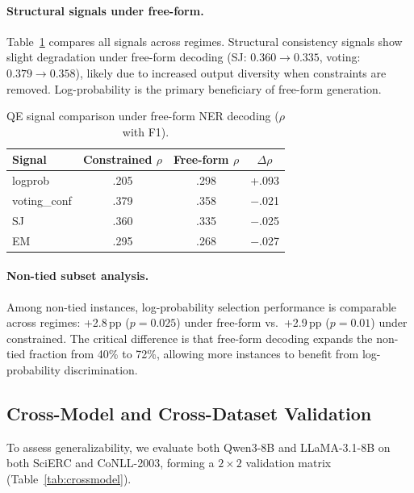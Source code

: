 \documentclass[11pt,a4paper]{article}
\begin{document}
\paragraph{Structural signals under free-form.} Table~\ref{tab:freeform-signals} compares all signals across regimes. Structural consistency signals show slight degradation under free-form decoding (SJ: $0.360 \to 0.335$, voting: $0.379 \to 0.358$), likely due to increased output diversity when constraints are removed. Log-probability is the primary beneficiary of free-form generation.

\begin{table}[t]
\centering
\small
\caption{QE signal comparison under free-form NER decoding ($\rho$ with F1).}
\label{tab:freeform-signals}
\begin{tabular}{lccc}
\toprule
Signal & Constrained $\rho$ & Free-form $\rho$ & $\Delta\rho$ \\
\midrule
logprob & .205 & .298 & +.093 \\
voting\_conf & .379 & .358 & $-$.021 \\
SJ & .360 & .335 & $-$.025 \\
EM & .295 & .268 & $-$.027 \\
\bottomrule
\end{tabular}
\end{table}

\paragraph{Non-tied subset analysis.} Among non-tied instances, log-probability selection performance is comparable across regimes: +2.8\,pp ($p{=}0.025$) under free-form vs.\ +2.9\,pp ($p{=}0.01$) under constrained. The critical difference is that free-form decoding expands the non-tied fraction from 40\% to 72\%, allowing more instances to benefit from log-probability discrimination.

\subsection{Cross-Model and Cross-Dataset Validation}
\label{sec:crossval}

To assess generalizability, we evaluate both Qwen3-8B and LLaMA-3.1-8B on both SciERC and CoNLL-2003, forming a $2{\times}2$ validation matrix (Table~\ref{tab:crossmodel}).
\end{document}
